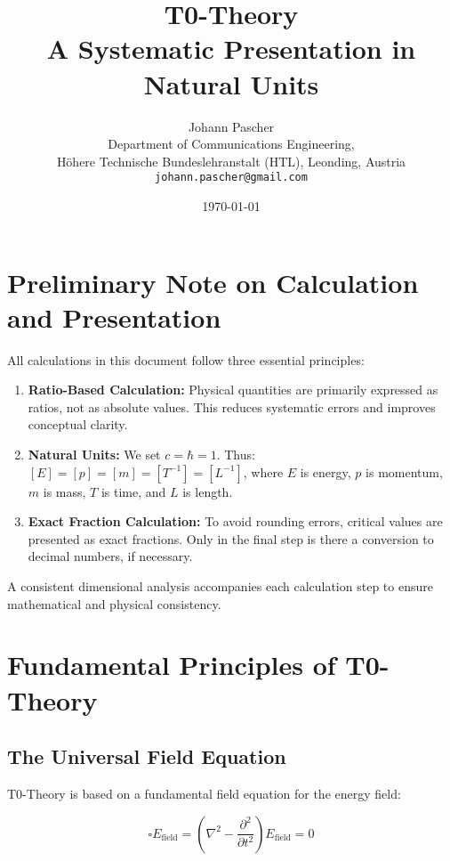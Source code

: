 \documentclass[12pt,a4paper]{article}
\title{\Huge\textbf{T0-Theory}\\\Large A Systematic Presentation in Natural Units}
\author{Johann Pascher\\
	Department of Communications Engineering, \\Höhere Technische Bundeslehranstalt (HTL), Leonding, Austria\\
	\texttt{johann.pascher@gmail.com}}
\date{\today}
\newcommand{\efield}{E_{\text{field}}}
\theoremstyle{definition}
\begin{document}
	
	\maketitle
	\tableofcontents
	\thispagestyle{fancy}
	\newpage
	
	\section*{Preliminary Note on Calculation and Presentation}
	
	\begin{wichtig}
		All calculations in this document follow three essential principles:
		
		\begin{enumerate}[label=\textbf{\arabic*.}]
			\item \textbf{Ratio-Based Calculation:} Physical quantities are primarily expressed as ratios, not as absolute values. This reduces systematic errors and improves conceptual clarity.
			
			\item \textbf{Natural Units:} We set $c = \hbar = 1$. Thus: $[E] = [p] = [m] = [T^{-1}] = [L^{-1}]$, where $E$ is energy, $p$ is momentum, $m$ is mass, $T$ is time, and $L$ is length.
			
			\item \textbf{Exact Fraction Calculation:} To avoid rounding errors, critical values are presented as exact fractions. Only in the final step is there a conversion to decimal numbers, if necessary.
		\end{enumerate}
		
		A consistent dimensional analysis accompanies each calculation step to ensure mathematical and physical consistency.
	\end{wichtig}
	
	\section{Fundamental Principles of T0-Theory}
	
	\subsection{The Universal Field Equation}
	
	T0-Theory is based on a fundamental field equation for the energy field:
	
	\begin{equation}
		\boxed{\square \efield = \left(\nabla^2 - \frac{\partial^2}{\partial t^2}\right) \efield = 0}
	\end{equation}
	
\end{document}
